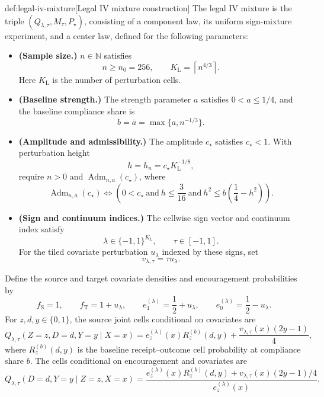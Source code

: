 \begin{algorithmv}{def:legal-iv-mixture}[Legal IV mixture construction]
The legal IV mixture is the triple \((Q_{\lambda,\tau},M_{\tau},P_{\star})\), consisting of a component law, its uniform sign-mixture experiment, and a center law, defined for the following parameters:
\begin{itemize}
\item \textbf{(Sample size.)} \(n\in\mathbb N\) satisfies
\[
n\ge n_0=256,
\qquad
K_{\mathrm L}=\left\lceil n^{4/3}\right\rceil.
\]
Here \(K_{\mathrm L}\) is the number of perturbation cells.
\item \textbf{(Baseline strength.)} The strength parameter \(a\) satisfies \(0<a\le1/4\), and the baseline compliance share is
\[
b=\bar a=\max\{a,n^{-1/3}\}.
\]
\item \textbf{(Amplitude and admissibility.)} The amplitude \(c_{\star}\) satisfies \(c_{\star}<1\). With perturbation height
\[
h=h_n=c_{\star}K_{\mathrm L}^{-1/8},
\]
require \(n>0\) and \(\operatorname{Adm}_{n,a}(c_{\star})\), where
\[
\operatorname{Adm}_{n,a}(c_{\star})
\Longleftrightarrow
\left(
0<c_{\star}
\ \text{and}\
h\le\frac{3}{16}
\ \text{and}\
h^2\le b\left(\frac14-h^2\right)
\right).
\]
\item \textbf{(Sign and continuum indices.)} The cellwise sign vector and continuum index satisfy
\[
\lambda\in\{-1,1\}^{K_{\mathrm L}},
\qquad
\tau\in[-1,1].
\]
For the tiled covariate perturbation \(u_{\lambda}\) indexed by these signs, set
\[
v_{\lambda,\tau}=\tau u_{\lambda}.
\]
\end{itemize}

Define the source and target covariate densities and encouragement probabilities by
\[
f_{\mathrm S}=1,
\qquad
f_{\mathrm T}=1+u_{\lambda},
\qquad
e_1^{(\lambda)}=\frac12+u_{\lambda},
\qquad
e_0^{(\lambda)}=\frac12-u_{\lambda}.
\]
For \(z,d,y\in\{0,1\}\), the source joint cells conditional on covariates are
\[
Q_{\lambda,\tau}(Z=z,D=d,Y=y\mid X=x)
=
e_z^{(\lambda)}(x)R_z^{(b)}(d,y)
+\frac{v_{\lambda,\tau}(x)(2y-1)}4,
\]
where \(R_z^{(b)}(d,y)\) is the baseline receipt–outcome cell probability at compliance share \(b\). The cells conditional on encouragement and covariates are
\[
Q_{\lambda,\tau}(D=d,Y=y\mid Z=z,X=x)
=
\frac{
e_z^{(\lambda)}(x)R_z^{(b)}(d,y)
+v_{\lambda,\tau}(x)(2y-1)/4
}{
e_z^{(\lambda)}(x)
}.
\]


\end{algorithmv}
